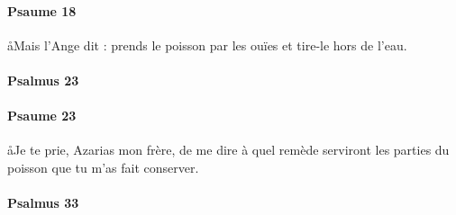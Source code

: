 \documentclass[twoside]{article}
\begin{document}
\begin{paracol}[1]{2}

\begin{enumerate}[wide, itemsep=0mm, labelwidth=!, labelindent=0pt, label=\color{gregoriocolor}\theenumi]


\end{enumerate}

\switchcolumn

\paragraph{Psaume 18}
\aa Mais l’Ange dit : prends le poisson par les ouïes et tire-le hors de l’eau.


\begin{enumerate}[wide, itemsep=0mm, labelwidth=!, labelindent=0pt, label=\color{gregoriocolor}\theenumi]


\end{enumerate}

\switchcolumn*

\paragraph{Psalmus 23}


\begin{enumerate}[wide, itemsep=0mm, labelwidth=!, labelindent=0pt, label=\color{gregoriocolor}\theenumi]


\end{enumerate}

\switchcolumn

\paragraph{Psaume 23}
\aa Je te prie, Azarias mon frère, de me dire à quel remède serviront les parties du poisson que tu m’as fait conserver.


\begin{enumerate}[wide, itemsep=0mm, labelwidth=!, labelindent=0pt, label=\color{gregoriocolor}\theenumi]


\end{enumerate}

\switchcolumn*

\paragraph{Psalmus 33}


\end{paracol}
\end{document}
